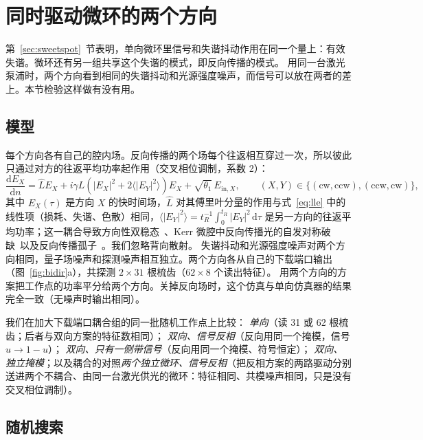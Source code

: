 \section{同时驱动微环的两个方向}\label{sec:bidir}

第~\ref{sec:sweetspot}~节表明，单向微环里信号和失谐抖动作用在同一个量上：有效失谐。微环还有另一组共享这个失谐的模式，即反向传播的模式。
用同一台激光泵浦时，两个方向看到相同的失谐抖动和光源强度噪声，而信号可以放在两者的差上。本节检验这样做有没有用。

\subsection{模型}

每个方向各有自己的腔内场。反向传播的两个场每个往返相互穿过一次，所以彼此只通过对方的往返平均功率起作用（交叉相位调制，系数 2）：
\begin{equation}
\frac{\mathrm{d}E_X}{\mathrm{d}n} = \hat{L}E_X + i\gamma L\left(|E_X|^2 + 2\langle|E_Y|^2\rangle\right)E_X + \sqrt{\theta_1}\,E_{\mathrm{in},X},
\qquad (X,Y)\in\{(\mathrm{cw},\mathrm{ccw}),(\mathrm{ccw},\mathrm{cw})\},
\label{eq:bidir}
\end{equation}
其中 $E_X(\tau)$ 是方向 $X$ 的快时间场，$\hat L$ 对其傅里叶分量的作用与式~\eqref{eq:lle} 中的线性项（损耗、失谐、色散）相同，$\langle|E_Y|^2\rangle=t_R^{-1}\int_0^{t_R}|E_Y|^2\,\mathrm{d}\tau$ 是另一方向的往返平均功率；这一耦合导致方向性双稳态~\cite{kaplan1982}、Kerr 微腔中反向传播光的自发对称破缺~\cite{delbino2017}以及反向传播孤子~\cite{yang2017}。我们忽略背向散射。
失谐抖动和光源强度噪声对两个方向相同，量子场噪声和探测噪声相互独立。两个方向各从自己的下载端口输出（图~\ref{fig:bidir}a），共探测 $2\times31$ 根梳齿（$62\times8$ 个读出特征）。
用两个方向的方案把工作点的功率平分给两个方向。关掉反向场时，这个仿真与单向仿真器的结果完全一致（无噪声时输出相同）。

我们在加大下载端口耦合组的同一批随机工作点上比较：
\emph{单向}（读 31 或 62 根梳齿；后者与双向方案的特征数相同）；
\emph{双向、信号反相}（反向用同一个掩模，信号 $u\to1-u$）；
\emph{双向、只有一侧带信号}（反向用同一个掩模、符号恒定）；
\emph{双向、独立掩模}；以及耦合的对照\emph{两个独立微环、信号反相}（把反相方案的两路驱动分别送进两个不耦合、由同一台激光供光的微环：特征相同、共模噪声相同，只是没有交叉相位调制）。

\subsection{随机搜索}

